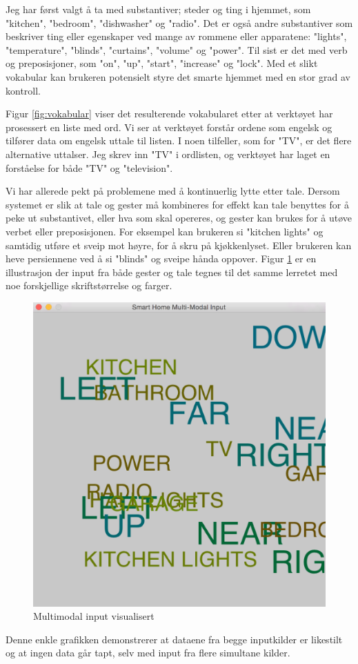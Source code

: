 Jeg har først valgt å ta med substantiver; steder og ting i hjemmet, som "kitchen", "bedroom", "dishwasher" og "radio". Det er også andre substantiver som beskriver ting eller egenskaper ved mange av rommene eller apparatene: "lights", "temperature", "blinds", "curtains", "volume" og "power". Til sist er det med verb og preposisjoner, som "on", "up", "start", "increase" og "lock". Med et slikt vokabular kan brukeren potensielt styre det smarte hjemmet med en stor grad av kontroll.

Figur \ref{fig:vokabular} viser det resulterende vokabularet etter at verktøyet har prosessert en liste med ord. Vi ser at verktøyet forstår ordene som engelsk og tilfører data om engelsk uttale til listen. I noen tilfeller, som for "TV", er det flere alternative uttalser. Jeg skrev inn "TV" i ordlisten, og verktøyet har laget en forståelse for både "TV" og "television".

Vi har allerede pekt på problemene med å kontinuerlig lytte etter tale. Dersom systemet er slik at tale og gester må kombineres for effekt kan tale benyttes for å peke ut substantivet, eller hva som skal opereres, og gester kan brukes for å utøve verbet eller preposisjonen. For eksempel kan brukeren si "kitchen lights" og samtidig utføre et sveip mot høyre, for å skru på kjøkkenlyset. Eller brukeren kan heve persiennene ved å si "blinds" og sveipe hånda oppover. Figur \ref{fig:multimodalvisualisert} er en illustrasjon der input fra både gester og tale tegnes til det samme lerretet med noe forskjellige skriftstørrelse og farger.
\begin{figure}
\centering
\includegraphics[scale=0.2]{fig/screenshot_project2}
\caption{Multimodal input visualisert}
\label{fig:multimodalvisualisert}
\end{figure}
Denne enkle grafikken demonstrerer at dataene fra begge inputkilder er likestilt og at ingen data går tapt, selv med input fra flere simultane kilder.


